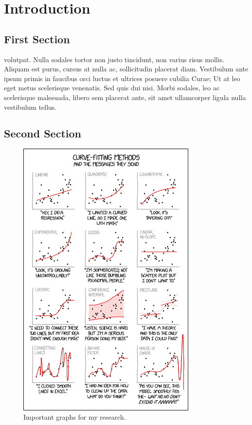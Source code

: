 \chapter{Introduction}


\section{First Section}
 volutpat. Nulla sodales tortor non justo tincidunt, non varius risus mollis. Aliquam est purus, cursus at nulla ac, sollicitudin placerat diam. Vestibulum ante ipsum primis in faucibus orci luctus et ultrices posuere cubilia Curae; Ut at leo eget metus scelerisque venenatis. Sed quis dui nisi. Morbi sodales, leo ac scelerisque malesuada, libero sem placerat ante, sit amet ullamcorper ligula nulla vestibulum tellus.

\section{Second Section}

\begin{figure}[ht]
	\includegraphics[width=0.8\textwidth]{figures/curve_fitting}
	\centering
	\caption{Important graphs for my research.}
	\centering
	\label{fig:curve_fitting}
\end{figure}
